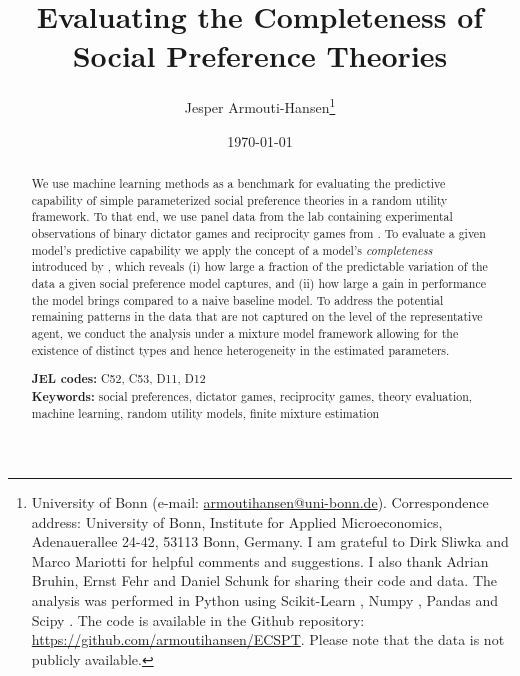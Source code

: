 \documentclass[11pt,a4paper]{article}
\theoremstyle{definition}
\begin{document}
\title{\vspace{-2cm}\large \textbf{Evaluating the Completeness of Social Preference Theories}}
\author{Jesper Armouti-Hansen\thanks{University of Bonn (e-mail: \href{mailto:armoutihansen@uni-bonn.de}{armoutihansen@uni-bonn.de}). Correspondence address: University of Bonn, Institute for Applied Microeconomics, Adenauerallee 24-42, 53113 Bonn, Germany. I am grateful to Dirk Sliwka and Marco Mariotti for helpful comments and suggestions. I also thank Adrian Bruhin, Ernst Fehr and Daniel Schunk for sharing their code and data. The analysis was performed in Python using Scikit-Learn \citep{Pedregosa2011}, Numpy \citep{Harris2020}, Pandas \citep{Mckinney2010} and Scipy \citep{Virtanen2020}. The code is available in the Github repository: \url{https://github.com/armoutihansen/ECSPT}. Please note that the data is not publicly available.}}
\date{\today}
\maketitle
\begin{abstract}
 We use machine learning methods as a benchmark for evaluating the predictive capability of simple parameterized social preference theories in a random utility framework. To that end, we use panel data from the lab containing experimental observations of binary dictator games and reciprocity games from \cite{Bruhin2019}. To evaluate a given model's predictive capability we apply the concept of a model's \emph{completeness} introduced by \cite{Fudenberg2021b}, which reveals (i) how large a fraction of the predictable variation of the data a given social preference model captures, and (ii) how large a gain in performance the model brings compared to a naive baseline model. To address the potential remaining patterns in the data that are not captured on the level of the representative agent,  we conduct the analysis under a mixture model framework allowing for the existence of distinct types and hence heterogeneity in the estimated parameters.

\textbf{JEL codes:} C52, C53, D11, D12\\
\textbf{Keywords:} social preferences, dictator games, reciprocity games, theory evaluation, machine learning, random utility models, finite mixture estimation
\end{abstract}
\end{document}
